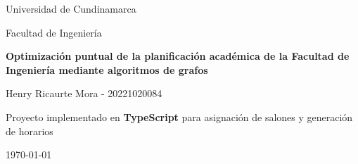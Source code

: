 \begin{titlepage}
    \centering
    {\Large Universidad de Cundinamarca \par}
    \vspace{0.5cm}
    {\large Facultad de Ingeniería \par}
    \vspace{2cm}
    {\Huge\bfseries Optimización puntual de la planificación académica de la Facultad de Ingeniería mediante algoritmos de grafos\par}
    \vspace{1.5cm}
    {\Large Henry Ricaurte Mora - 20221020084 \par}
    \vspace{1cm}
    {\large Proyecto implementado en \textbf{TypeScript} para asignación de salones y generación de horarios\par}
    \vfill
    {\large \today\par}
\end{titlepage}

